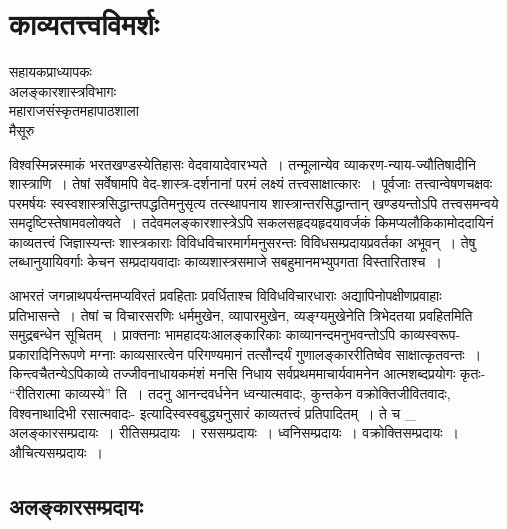 {\fontsize{15}{17}\selectfont
\presetvalues
\chapter{काव्यतत्त्वविमर्शः}

\begin{center}
\smallskip

सहायकप्राध्यापकः\\
अलङ्कारशास्त्रविभागः\\
महाराजसंस्कृतमहापाठशाला\\
मैसूरु
\addrule
\end{center}
विश्वस्मिन्नस्माकं भरतखण्डस्येतिहासः वेदवायादेवारभ्यते~। तन्मूलान्येव व्याकरण-न्याय-ज्यौतिषादीनि शास्त्राणि~। तेषां सर्वेषामपि वेद-शास्त्र-दर्शनानां परमं लक्ष्यं तत्त्वसाक्षात्कारः~। पूर्वजाः तत्त्वान्वेषणचक्षवः परमर्षयः स्वस्वशास्त्रसिद्धान्तपद्धतिमनुसृत्य तत्स्थापनाय शास्त्रान्तरसिद्धान्तान् खण्डयन्तोऽपि तत्त्वसमन्वये समदृष्टिस्तेषामवलोक्यते~।  तदेवमलङ्कारशास्त्रेऽपि सकलसहृदयहृदयावर्जकं किमप्यलौकिकामोददायिनं काव्यतत्त्वं जिज्ञास्यन्तः शास्त्रकाराः विविधविचारमार्गमनुसरन्तः विविधसम्प्रदायप्रवर्तका अभूवन्~। तेषु लब्धानुयायिवर्गाः केचन सम्प्रदायवादाः काव्यशास्त्रसमाजे सबहुमानमभ्युपगता विस्तारिताश्च~। 

आभरतं जगन्नाथपर्यन्तमप्यविरतं प्रवहिताः प्रवर्धिताश्च विविधविचारधाराः अद्यापि\break नोपक्षीणप्रवाहाः प्रतिभासन्ते~। तेषां च विचारसरणिः धर्ममुखेन, व्यापारमुखेन, व्यङ्ग्य\-मुखेनेति त्रिभेदतया प्रवहितमिति समुद्रबन्धेन सूचितम्~। प्राक्तनाः भामहादयः\break आलङ्कारिकाः काव्यानन्दमनुभवन्तोऽपि काव्यस्वरूप-प्रकारादिनिरूपणे मग्नाः काव्यसारत्वेन परिगण्यमानं तत्सौन्दर्यं गुणालङ्काररीतिष्वेव साक्षात्कृतवन्तः~। किन्त्वचैतन्येऽपि\break काव्ये तज्जीवनाधायकमंशं मनसि निधाय सर्वप्रथममाचार्यवामनेन आत्मशब्दप्रयोगः कृतः- “रीतिरात्मा काव्यस्ये” ति~।  तदनु आनन्दवर्धनेन ध्वन्यात्मवादः, कुन्तकेन वक्रोक्तिजीवितवादः, विश्वनाथादिभी रसात्मवादः- इत्यादिस्वस्वबुद्ध्यनुसारं काव्यतत्त्वं प्रतिपादितम्~। ते च \_    अलङ्कारसम्प्रदायः~।     रीतिसम्प्रदायः~। 	     रससम्प्रदायः~।   ध्वनि\-सम्प्रदायः~। 	   वक्रोक्तिसम्प्रदायः~।   औचित्यसम्प्रदायः~। 

\section*{ अलङ्कारसम्प्रदायः}

}
